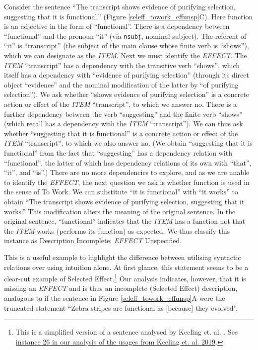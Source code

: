 \documentclass{article}
\begin{document}
Consider the sentence ``The transcript shows evidence of purifying selection, suggesting that it is functional.'' (Figure \ref{seleff_towork_effunsp}C).
Here function is an adjective in the form of ``functional''.
There is a dependency between ``functional'' and the pronoun ``it'' (via \texttt{nsubj}, nominal subject).
The referent of ``it'' is ``transcript'' (the subject of the main clause whose finite verb is ``shows''), which we can designate as the \emph{ITEM}.
Next we must identify the \emph{EFFECT}.
The \emph{ITEM} ``transcript'' has a dependency with the transitive verb ``shows'', which itself has a dependency with ``evidence of purifying selection'' (through its direct object ``evidence'' and the nominal modification of the latter by ``of purifying selection'').
We ask whether ``shows evidence of purifying selection'' is a concrete action or effect of the \emph{ITEM} ``transcript'', to which we answer no.
There is a further dependency between the verb ``suggesting'' and the finite verb ``shows'' (which recall has a dependency with the \emph{ITEM} ``transcript'').
We can thus ask whether ``suggesting that it is functional'' is a concrete action or effect of the \emph{ITEM} ``transcript'', to which we also answer no.
(We obtain ``suggesting that it is functional'' from the fact that ``suggesting'' has a dependency relation with ``functional'', the latter of which has dependency relations of its own with ``that'', ``it'', and ``is''.)
There are no more dependencies to explore, and as we are unable to identify the \emph{EFFECT}, the next question we ask is whether function is used in the sense of To Work.
We can substitute ``it is functional'' with ``it works'' to obtain ``The transcript shows evidence of purifying selection, suggesting that it works.''
This modification alters the meaning of the original sentence.
In the original sentence, ``functional'' indicates that the \emph{ITEM} has a function not that the \emph{ITEM} works (performs its function) as expected.
We thus classify this instance as Description Incomplete: \emph{EFFECT} Unspecified.

This is a useful example to highlight the difference between utilising syntactic relations over using intuition alone.
At first glance, this statement seems to be a clear-cut example of Selected Effect.\footnote{This is a simplified version of a sentence analysed by Keeling et. al. \cite{keeling2019}. See \href{https://joshuachristie.github.io/function-concepts/examples_Keeling_et_al_2019.html}{instance 26 in our analysis of the usages from Keeling et. al. 2019}.}
Our analysis indicates, however, that it is missing an \emph{EFFECT} and is thus an incomplete (Selected Effect) description, analogous to if the sentence in Figure \ref{seleff_towork_effunsp}A were the truncated statement ``Zebra stripes are functional as [because] they evolved''.
\end{document}
